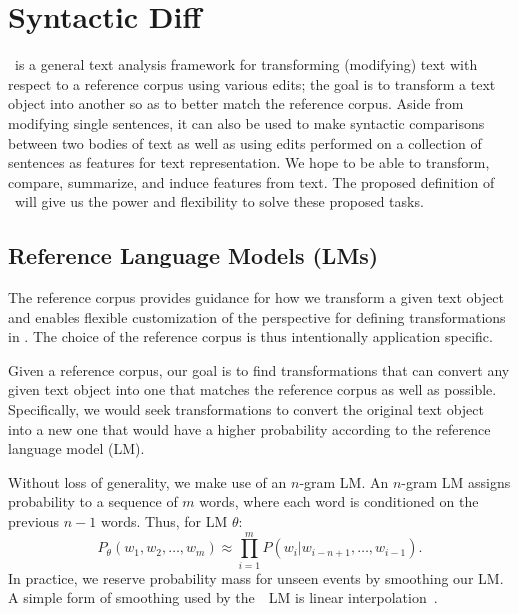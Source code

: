 \section{Syntactic Diff}
\label{sec:syndiff}

\sd~is a general text analysis framework for transforming (modifying) text with
respect to a reference corpus using various edits; the goal is to transform a
text object into another so as to better match the reference corpus. Aside from
modifying single sentences, it can also be used to make syntactic comparisons
between two bodies of text as well as using edits performed on a collection of
sentences as features for text representation. We hope to be able to transform,
compare, summarize, and induce features from text. The proposed definition of
\sd~will give us the power and flexibility to solve these proposed tasks.

\subsection{Reference Language Models (LMs)}

The reference corpus provides guidance for how we transform a given text object
and enables flexible customization of the perspective for defining
transformations in \sd. The choice of the reference corpus is thus intentionally
application specific.

Given a reference corpus, our goal is to find transformations that can convert
any given text object into one that matches the reference corpus as well as
possible. Specifically, we would seek transformations to convert the original
text object into a new one that would have a higher probability according to the
reference language model (LM).

Without loss of generality, we make use of an $n$-gram LM\@. An $n$-gram LM
assigns probability to a sequence of $m$ words, where each word is conditioned
on the previous $n-1$ words. Thus, for LM $\theta$:
$$P_{\theta}(w_1,w_2,\ldots,w_m) \approx
    \prod_{i=1}^m P(w_i|w_{i-n+1},\ldots,w_{i-1}).$$
In practice, we reserve probability mass for unseen events by smoothing our
LM\@. A simple form of smoothing used by the~\sd~LM is linear
interpolation~\cite{j-and-m}.


